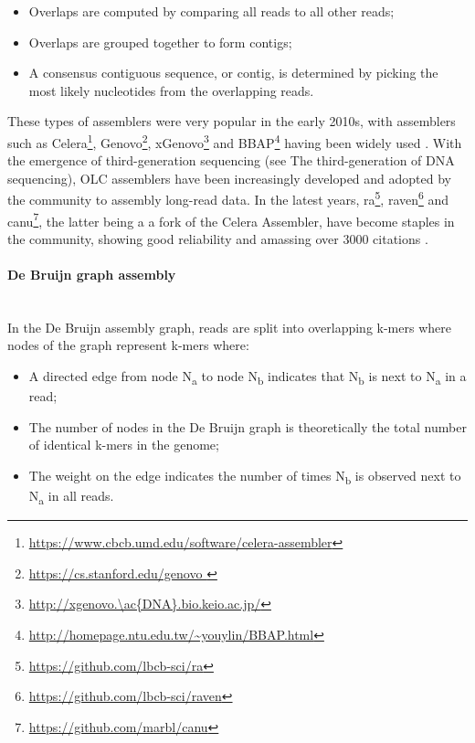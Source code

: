 \begin{itemize}
    \item Overlaps are computed by comparing all reads to all other reads;
    \item Overlaps are grouped together to form contigs;
    \item A consensus contiguous sequence, or contig, is determined by picking the most likely nucleotides from the overlapping reads.
\end{itemize}

These types of assemblers were very popular in the early 2010s, with assemblers such as Celera\footnote{\url{https://www.cbcb.umd.edu/software/celera-assembler}},  Genovo\footnote{\url{https://cs.stanford.edu/genovo }}, xGenovo\footnote{\url{http://xgenovo.\ac{DNA}.bio.keio.ac.jp/}} and BBAP\footnote{\url{http://homepage.ntu.edu.tw/~youylin/BBAP.html}} having been widely used \citep{myers_whole-genome_2000, hutchison_genovo_2010, afiahayati_extended_2013, lin_novo_2017}.
With the emergence of third-generation sequencing (see  The third-generation of \ac{DNA} sequencing), \ac{OLC} assemblers have been increasingly developed and adopted by the community to assembly long-read data. 
In the latest years, ra\footnote{\url{https://github.com/lbcb-sci/ra}}, raven\footnote{\url{https://github.com/lbcb-sci/raven}} and canu\footnote{\url{https://github.com/marbl/canu}}, the latter being a a fork of the Celera Assembler, have become staples in the community, showing good reliability and amassing over 3000 citations \citep{vaser_yet_2019, koren_canu_2017, wick_benchmarking_2021}.

\paragraph{De Bruijn graph assembly} \label{sssec:_intro_dbg_assembly} \mbox{}\\

In the De Bruijn assembly graph, reads are split into overlapping k-mers where nodes of the graph represent k-mers where:

\begin{itemize}
    \item A directed edge from node N\textsubscript{a} to node N\textsubscript{b} indicates that N\textsubscript{b} is next to N\textsubscript{a} in a read;
    \item The number of nodes in the De Bruijn graph is theoretically the total number of identical k-mers in the genome;
    \item The weight on the edge indicates the number of times N\textsubscript{b} is observed next to N\textsubscript{a} in all reads.
\end{itemize}

